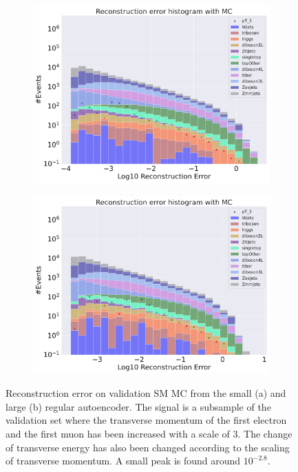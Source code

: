 \begin{figure}[H]
    \centering
    \begin{subfigure}{.45\textwidth}
        \includegraphics[width=\textwidth]{Figures/AE_testing/small/b_data_recon_big_rm3_feats_sig_pT_3.pdf}
        \caption{}
        \label{fig:ae_small_pt_3}
    \end{subfigure}
    \hfill 
    \begin{subfigure}{.45\textwidth}
        \includegraphics[width=\textwidth]{Figures/AE_testing/big/b_data_recon_big_rm3_feats_sig_pT_3.pdf}
        \caption{}
        \label{fig:ae_big_pt_3}
    \end{subfigure}
    \hfill 
    \caption[AE | Reconstruction error $p_T$ altering of 3]{Reconstruction error on validation SM MC from the small (a) and large (b) regular autoencoder. The signal is a subsample of the validation 
    set where the transverse momentum of the first electron and the first muon has been increased with a scale of $3$. The change of transverse 
    energy has also been changed according to the scaling of transverse momentum. A small peak is found around $10^{-2.8}$.  }
    \label{fig:ae_big_small_pt_3}
\end{figure}

